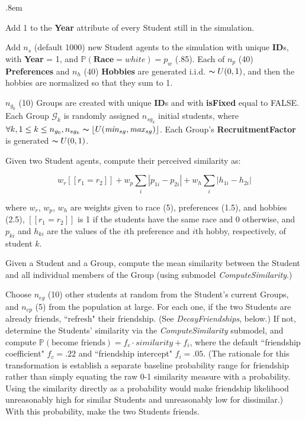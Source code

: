 \begin{description}
\itemsep.8em
\item[\textsl{IncrementYears}] Add 1 to the \textbf{Year} attribute of every Student
still in the simulation.

\item[\textsl{AddNewStudents}] Add $n_s$ (default 1000) new Student agents to the
simulation with unique \textbf{ID}s, with \textbf{Year} = 1, and
$\mathbb{P}(\textbf{Race}=white) = p_w$ (.85). Each of $n_p$ (40)
\textbf{Preferences} and $n_h$ (40) \textbf{Hobbies} are generated i.i.d.
$\thicksim U(0,1)$, and then the hobbies are normalized so that they sum to 1.

\item[\textsl{AddNewGroups}] $n_{g_0}$ (10) Groups are created with unique
\textbf{ID}s and with \textbf{isFixed} equal to FALSE. Each Group
$\mathcal{G}_k$ is randomly assigned $n_{sg_k}$ initial students, where
$\forall k, 1\leq k\leq n_{g_0}, n_{sg_k} \thicksim \left\lfloor
U(\text{\textit{min}}_{sg},\text{\textit{max}}_{sg}) \right\rfloor$. Each
Group's \textbf{RecruitmentFactor} is generated $\thicksim U(0,1)$.

\item[\textsl{ComputeSimilarity}] Given two Student agents, compute their perceived
similarity as:

\[
w_r [\![r_1=r_2]\!] +
w_p \sum_i |p_{1i}-p_{2i}| + 
w_h \sum_i |h_{1i}-h_{2i}|
\]

where $w_r$, $w_p$, $w_h$ are weights given to race (5), preferences
(1.5), and hobbies (2.5), $[\![r_1=r_2]\!]$ is 1 if the students have the same
race and 0 otherwise, and $p_{ki}$ and $h_{ki}$ are the values of the $i$th
preference and $i$th hobby, respectively, of student $k$.

\item[\textsl{ComputeAffinity}] Given a Student and a Group, compute the mean
similarity between the Student and all individual members of the Group (using
submodel \textsl{ComputeSimilarity}.)

\item[\textsl{EncounterOthers}] Choose $n_{eg}$ (10) other students at random
from the Student's current Groups, and $n_{ep}$ (5) from the population at
large. For each one, if the two Students are already friends, ``refresh" their
friendship. (See \textsl{DecayFriendships}, below.) If not, determine the
Students' similarity via the \textsl{ComputeSimilarity} submodel, and compute
$\mathbb{P}(\text{become friends})=f_c \cdot \textit{similarity} + f_i$, where
the default ``friendship coefficient" $f_c=.22$ and ``friendship intercept"
$f_i=.05$. (The rationale for this transformation is establish a separate
baseline probability range for friendship rather than simply equating the raw
0-1 similarity measure with a probability. Using the similarity directly as a
probability would make friendship likelihood unreasonably high for similar
Students and unreasonably low for dissimilar.) With this probability, make the
two Students friends.


\end{description}
